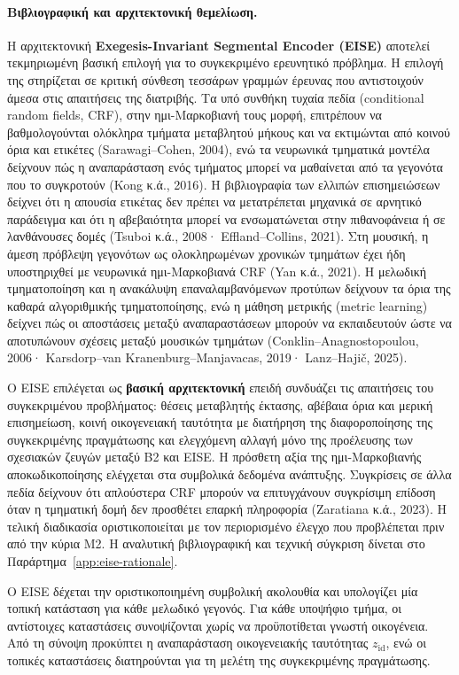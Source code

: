 \documentclass[11pt,a4paper]{article}
\begin{document}
\paragraph{Βιβλιογραφική και αρχιτεκτονική θεμελίωση.}
Η αρχιτεκτονική \textbf{Exegesis-Invariant Segmental Encoder (EISE)} αποτελεί τεκμηριωμένη βασική επιλογή για το συγκεκριμένο ερευνητικό πρόβλημα. Η επιλογή της στηρίζεται σε κριτική σύνθεση τεσσάρων γραμμών έρευνας που αντιστοιχούν άμεσα στις απαιτήσεις της διατριβής. Τα υπό συνθήκη τυχαία πεδία (conditional random fields, CRF), στην ημι-Μαρκοβιανή τους μορφή, επιτρέπουν να βαθμολογούνται ολόκληρα τμήματα μεταβλητού μήκους και να εκτιμώνται από κοινού όρια και ετικέτες (Sarawagi--Cohen, 2004), ενώ τα νευρωνικά τμηματικά μοντέλα δείχνουν πώς η αναπαράσταση ενός τμήματος μπορεί να μαθαίνεται από τα γεγονότα που το συγκροτούν (Kong κ.ά., 2016). Η βιβλιογραφία των ελλιπών επισημειώσεων δείχνει ότι η απουσία ετικέτας δεν πρέπει να μετατρέπεται μηχανικά σε αρνητικό παράδειγμα και ότι η αβεβαιότητα μπορεί να ενσωματώνεται στην πιθανοφάνεια ή σε λανθάνουσες δομές (Tsuboi κ.ά., 2008· Effland--Collins, 2021). Στη μουσική, η άμεση πρόβλεψη γεγονότων ως ολοκληρωμένων χρονικών τμημάτων έχει ήδη υποστηριχθεί με νευρωνικά ημι-Μαρκοβιανά CRF (Yan κ.ά., 2021). Η μελωδική τμηματοποίηση και η ανακάλυψη επαναλαμβανόμενων προτύπων δείχνουν τα όρια της καθαρά αλγοριθμικής τμηματοποίησης, ενώ η μάθηση μετρικής (metric learning) δείχνει πώς οι αποστάσεις μεταξύ αναπαραστάσεων μπορούν να εκπαιδευτούν ώστε να αποτυπώνουν σχέσεις μεταξύ μουσικών τμημάτων (Conklin--Anagnostopoulou, 2006· Karsdorp--van Kranenburg--Manjavacas, 2019· Lanz--Hajič, 2025).

Ο EISE επιλέγεται ως \textbf{βασική αρχιτεκτονική} επειδή συνδυάζει τις απαιτήσεις του συγκεκριμένου προβλήματος: θέσεις μεταβλητής έκτασης, αβέβαια όρια και μερική επισημείωση, κοινή οικογενειακή ταυτότητα με διατήρηση της διαφοροποίησης της συγκεκριμένης πραγμάτωσης και ελεγχόμενη αλλαγή μόνο της προέλευσης των σχεσιακών ζευγών μεταξύ B2 και EISE. Η πρόσθετη αξία της ημι-Μαρκοβιανής αποκωδικοποίησης ελέγχεται στα συμβολικά δεδομένα ανάπτυξης. Συγκρίσεις σε άλλα πεδία δείχνουν ότι απλούστερα CRF μπορούν να επιτυγχάνουν συγκρίσιμη επίδοση όταν η τμηματική δομή δεν προσθέτει επαρκή πληροφορία (Zaratiana κ.ά., 2023). Η τελική διαδικασία οριστικοποιείται με τον περιορισμένο έλεγχο που προβλέπεται πριν από την κύρια M2. Η αναλυτική βιβλιογραφική και τεχνική σύγκριση δίνεται στο Παράρτημα~\ref{app:eise-rationale}.

Ο EISE δέχεται την οριστικοποιημένη συμβολική ακολουθία και υπολογίζει μία τοπική κατάσταση για κάθε μελωδικό γεγονός. Για κάθε υποψήφιο τμήμα, οι αντίστοιχες καταστάσεις συνοψίζονται χωρίς να προϋποτίθεται γνωστή οικογένεια. Από τη σύνοψη προκύπτει η αναπαράσταση οικογενειακής ταυτότητας $z_{\mathrm{id}}$, ενώ οι τοπικές καταστάσεις διατηρούνται για τη μελέτη της συγκεκριμένης πραγμάτωσης.
\end{document}
